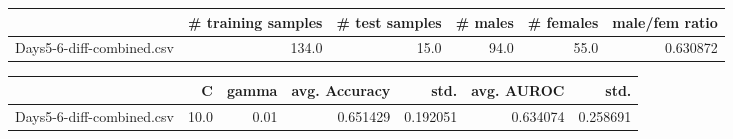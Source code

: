 \begin{tabular}{lrrrrr}
\hline
{} &  \# training samples &  \# test samples &  \# males &  \# females &  male/fem ratio \\
\hline
Days5-6-diff-combined.csv &               134.0 &            15.0 &     94.0 &       55.0 &        0.630872 \\
\hline
\end{tabular}
\begin{tabular}{lrrrrrr}
\hline
{} &     C &  gamma &  avg. Accuracy &      std. &  avg. AUROC &      std. \\
\hline
Days5-6-diff-combined.csv &  10.0 &   0.01 &       0.651429 &  0.192051 &    0.634074 &  0.258691 \\
\hline
\end{tabular}
